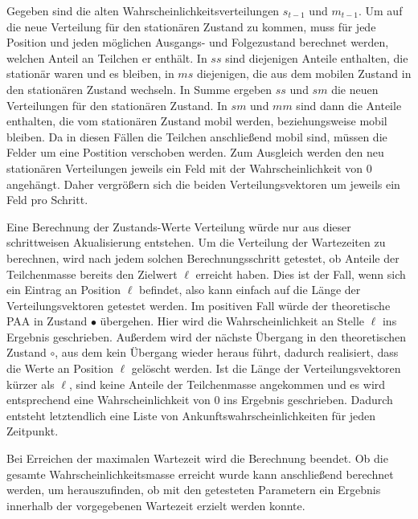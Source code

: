 Gegeben sind die alten Wahrscheinlichkeitsverteilungen $s_{t-1}$ und $m_{t-1}$.
Um auf die neue Verteilung für den stationären Zustand zu kommen, muss für jede Position und jeden möglichen Ausgangs- und Folgezustand berechnet werden, welchen Anteil an Teilchen er enthält. 
In $ss$ sind diejenigen Anteile enthalten, die stationär waren und es bleiben, in $ms$ diejenigen, die aus dem mobilen Zustand in den stationären Zustand wechseln. In Summe ergeben $ss$ und $sm$ die neuen Verteilungen für den stationären Zustand.
In $sm$ und $mm$ sind dann die Anteile enthalten, die vom stationären Zustand mobil werden, beziehungsweise mobil bleiben. Da in diesen Fällen die Teilchen anschließend mobil sind, müssen die Felder um eine Postition verschoben werden. Zum Ausgleich werden den neu stationären Verteilungen jeweils ein Feld mit der Wahrscheinlichkeit von $0$ angehängt.
Daher vergrößern sich die beiden Verteilungsvektoren um jeweils ein Feld pro Schritt.

Eine Berechnung der Zustands-Werte Verteilung würde nur aus dieser schrittweisen Akualisierung entstehen. Um die Verteilung der Wartezeiten zu berechnen, wird nach jedem solchen Berechnungsschritt getestet, ob Anteile der Teilchenmasse bereits den Zielwert $\ell$ erreicht haben. Dies ist der Fall, wenn sich ein Eintrag an Position $\ell$ befindet, also kann einfach auf die Länge der Verteilungsvektoren getestet werden. Im positiven Fall würde der theoretische PAA in Zustand $\bullet$ übergehen. Hier wird die Wahrscheinlichkeit an Stelle $\ell$ ins Ergebnis geschrieben. Außerdem wird der nächste Übergang in den theoretischen Zustand $\circ$, aus dem kein Übergang wieder heraus führt, dadurch realisiert, dass die Werte an Position $\ell$ gelöscht werden.
Ist die Länge der Verteilungsvektoren kürzer als $\ell$, sind keine Anteile der Teilchenmasse angekommen und es wird entsprechend eine Wahrscheinlichkeit von $0$ ins Ergebnis geschrieben.
Dadurch entsteht letztendlich eine Liste von Ankunftswahrscheinlichkeiten für jeden Zeitpunkt.

Bei Erreichen der maximalen Wartezeit wird die Berechnung beendet. Ob die gesamte Wahrscheinlichkeitsmasse erreicht wurde kann anschließend berechnet werden, um herauszufinden, ob mit den getesteten Parametern ein Ergebnis innerhalb der vorgegebenen Wartezeit erzielt werden konnte. 

